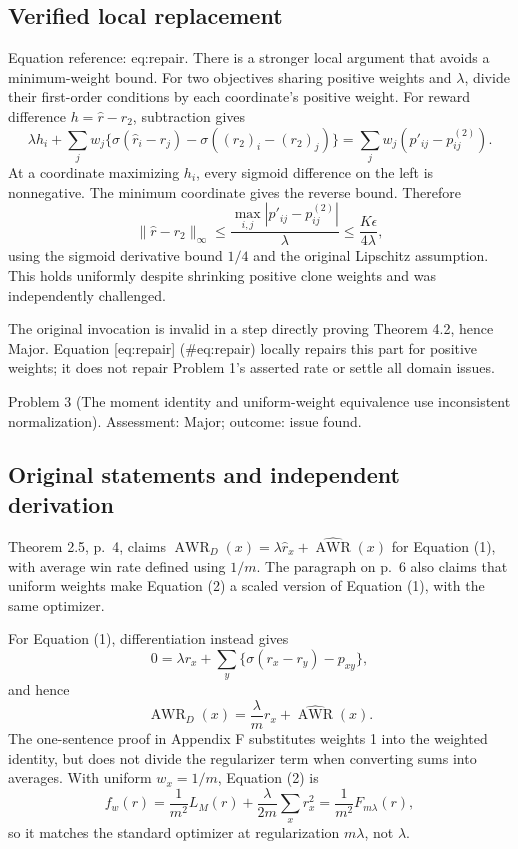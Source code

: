 \documentclass[10pt]{article}
\begin{document}
\subsection*{Verified local replacement}
Equation reference: eq:repair. There is a stronger local argument that avoids a minimum-weight bound. For two objectives sharing positive weights and \(\lambda\), divide their first-order conditions by each coordinate’s positive weight. For reward difference \(h=\widehat r-r_2\), subtraction gives \[\lambda h_i+\sum_j w_j\{\sigma(\widehat r_i-\widehat r_j)
                  -\sigma((r_2)_i-(r_2)_j)\}
       =\sum_jw_j(p'_{ij}-p^{(2)}_{ij}).\] At a coordinate maximizing \(h_i\), every sigmoid difference on the left is nonnegative. The minimum coordinate gives the reverse bound. Therefore \[
 \|\widehat r-r_2\|_\infty
 \le\frac{\max_{i,j}|p'_{ij}-p^{(2)}_{ij}|}{\lambda}
 \le\frac{K\epsilon}{4\lambda},\] using the sigmoid derivative bound \(1/4\) and the original Lipschitz assumption. This holds uniformly despite shrinking positive clone weights and was independently challenged.\par
The original invocation is invalid in a step directly proving Theorem 4.2, hence Major. Equation [eq:repair] (\#eq:repair) locally repairs this part for positive weights; it does not repair Problem 1’s asserted rate or settle all domain issues.\par
Problem 3 (The moment identity and uniform-weight equivalence use inconsistent normalization).  Assessment: Major; outcome: issue found.\par
\subsection*{Original statements and independent derivation}
Theorem 2.5, p. 4, claims \(\operatorname{AWR}_D(x)=\lambda\widehat r_x+\widehat{\operatorname{AWR}}(x)\) for Equation (1), with average win rate defined using \(1/m\). The paragraph on p. 6 also claims that uniform weights make Equation (2) a scaled version of Equation (1), with the same optimizer.\par
For Equation (1), differentiation instead gives \[0=\lambda r_x+\sum_y\{\sigma(r_x-r_y)-p_{xy}\},\] and hence \[\operatorname{AWR}_D(x)=\frac{\lambda}{m}r_x+
                  \widehat{\operatorname{AWR}}(x).\] The one-sentence proof in Appendix F substitutes weights 1 into the weighted identity, but does not divide the regularizer term when converting sums into averages. With uniform \(w_x=1/m\), Equation (2) is \[f_w(r)=\frac1{m^2}L_M(r)+\frac{\lambda}{2m}\sum_xr_x^2
       =\frac1{m^2}F_{m\lambda}(r),\] so it matches the standard optimizer at regularization \(m\lambda\), not \(\lambda\).\par
\end{document}
